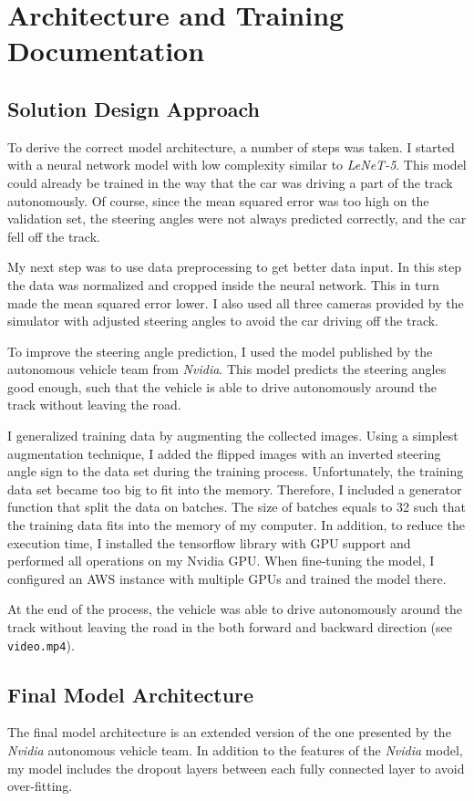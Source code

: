 \documentclass[a4paper,12pt]{article}
\begin{document}
\section{Architecture and Training Documentation}

\subsection{Solution Design Approach}
To derive the correct model architecture, a number of steps was taken. I started with a neural network model with low complexity similar to \textit{LeNeT-5}. This model could already be trained in the way that the car was driving a part of the track autonomously. Of course, since the mean squared error was too high on the validation set, the steering angles were not always predicted correctly, and the car fell off the track.

My next step was to use data preprocessing to get better data input. In this step the data was normalized and cropped inside the neural network. This in turn made the mean squared error lower. I also used all three cameras provided by the simulator with adjusted steering angles to avoid the car driving off the track.

To improve the steering angle prediction, I used the model published by the autonomous vehicle team from \textit{Nvidia}. This model predicts the steering angles good enough, such that the vehicle is able to drive autonomously around the track without leaving the road.

I generalized training data by augmenting the collected images. Using a simplest augmentation technique, I added the flipped images with an inverted steering angle sign to the data set during the training process. Unfortunately, the training data set became too big to fit into the memory. Therefore, I included a generator function that split the data on batches. The size of batches equals to 32 such that the training data fits into the memory of my computer. In addition, to reduce the execution time, I installed the tensorflow library with GPU support and performed all operations on my Nvidia GPU. When fine-tuning the model, I configured an AWS instance with multiple GPUs and trained the model there.

At the end of the process, the vehicle was able to drive autonomously around the track without leaving the road in the both forward and backward direction (see \texttt{video.mp4}).

\subsection{Final Model Architecture}
The final model architecture is an extended version of the one presented by the \textit{Nvidia} autonomous vehicle team. In addition to the features of the \textit{Nvidia} model, my model includes the dropout layers between each fully connected layer to avoid over-fitting.
\end{document}
